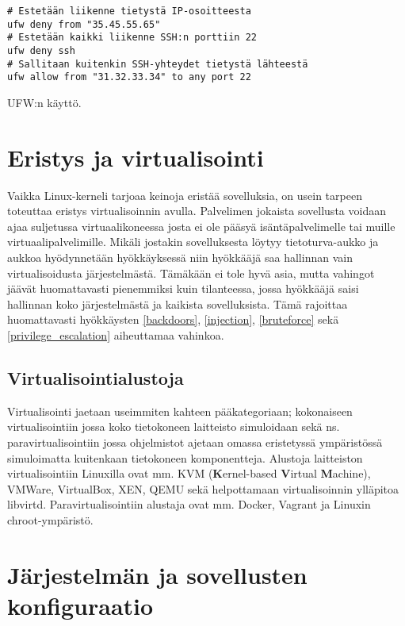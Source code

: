 \begin{algorithm}[tbh]
\begin{verbatim}
# Estetään liikenne tietystä IP-osoitteesta
ufw deny from "35.45.55.65"
# Estetään kaikki liikenne SSH:n porttiin 22
ufw deny ssh
# Sallitaan kuitenkin SSH-yhteydet tietystä lähteestä
ufw allow from "31.32.33.34" to any port 22
\end{verbatim}
\caption{UFW:n käyttö.\label{alg:ufw}}
\end{algorithm}


\section{Eristys ja virtualisointi}\label{eristys_ja_virtualisointi}
Vaikka Linux-kerneli tarjoaa keinoja eristää sovelluksia, on usein tarpeen toteuttaa eristys virtualisoinnin avulla. Palvelimen jokaista sovellusta voidaan ajaa suljetussa virtuaalikoneessa josta ei ole pääsyä isäntäpalvelimelle tai muille virtuaalipalvelimille. Mikäli jostakin sovelluksesta löytyy tietoturva-aukko ja aukkoa hyödynnetään hyökkäyksessä niin hyökkääjä saa hallinnan vain virtualisoidusta järjestelmästä. Tämäkään ei tole hyvä asia, mutta vahingot jäävät huomattavasti pienemmiksi kuin tilanteessa, jossa hyökkääjä saisi hallinnan koko järjestelmästä ja kaikista sovelluksista. Tämä rajoittaa huomattavasti hyökkäysten \ref{backdoors}, \ref{injection}, \ref{bruteforce} sekä \ref{privilege_escalation} aiheuttamaa vahinkoa.~\cite{portnoy2016virtualization}

\subsection{Virtualisointialustoja}\label{virtualisoinnin_tyokaluja}
Virtualisointi jaetaan useimmiten kahteen pääkategoriaan; kokonaiseen virtualisointiin jossa koko tietokoneen laitteisto simuloidaan sekä ns. paravirtualisointiin jossa ohjelmistot ajetaan omassa eristetyssä ympäristössä simuloimatta kuitenkaan tietokoneen komponentteja.
Alustoja laitteiston virtualisointiin Linuxilla ovat mm. KVM (\textbf{K}ernel-based \textbf{V}irtual \textbf{M}achine), VMWare, VirtualBox, XEN, QEMU sekä helpottamaan virtualisoinnin ylläpitoa libvirtd.
Paravirtualisointiin alustaja ovat mm. Docker, Vagrant ja Linuxin chroot-ympäristö.~\cite{portnoy2016virtualization}

\section{Järjestelmän ja sovellusten konfiguraatio}\label{sovellusten_konfiguraatio}


